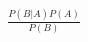 \documentclass[preview]{standalone}
\begin{document}
\begin{align*}
\frac{P(B|A) P(A)}{P(B)}
\end{align*}
\end{document}
